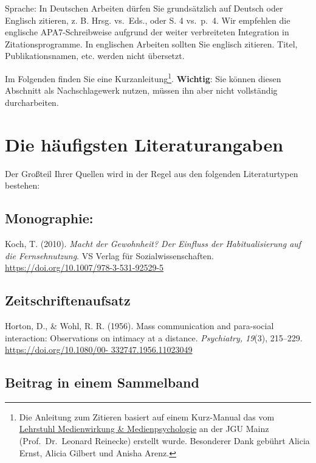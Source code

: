 \documentclass[
  letterpaper,
  DIV=11]{scrreprt}
\begin{document}
Sprache: In Deutschen Arbeiten dürfen Sie grundsätzlich auf Deutsch oder
Englisch zitieren, z. B. Hrsg. vs.~Eds., oder S. 4 vs.~p.~4. Wir
empfehlen die englische APA7-Schreibweise aufgrund der weiter
verbreiteten Integration in Zitationsprogramme. In englischen Arbeiten
sollten Sie englisch zitieren. Titel, Publikationsnamen, etc. werden
nicht übersetzt.

Im Folgenden finden Sie eine Kurzanleitung\footnote{Die Anleitung zum
  Zitieren basiert auf einem Kurz-Manual das vom
  \href{https://www.medienpsychologie.ifp.uni-mainz.de/}{Lehrstuhl
  Medienwirkung \& Medienpsychologie} an der JGU Mainz
  (Prof.~Dr.~Leonard Reinecke) erstellt wurde. Besonderer Dank gebührt
  Alicia Ernst, Alicia Gilbert und Anisha Arenz.}. \textbf{Wichtig}: Sie
können diesen Abschnitt als Nachschlagewerk nutzen, müssen ihn aber
nicht vollständig durcharbeiten.

\section{Die häufigsten
Literaturangaben}\label{die-huxe4ufigsten-literaturangaben}

Der Großteil Ihrer Quellen wird in der Regel aus den folgenden
Literaturtypen bestehen:

\subsection{Monographie:}\label{monographie}

Koch, T. (2010). \emph{Macht der Gewohnheit? Der Einfluss der
Habitualisierung auf die Fernsehnutzung}. VS Verlag für
Sozialwissenschaften. \url{https://doi.org/10.1007/978-3-531-92529-5}

\subsection{Zeitschriftenaufsatz}\label{zeitschriftenaufsatz}

Horton, D., \& Wohl, R. R. (1956). Mass communication and para-social
interaction: Observations on intimacy at a distance. \emph{Psychiatry,
19}(3), 215--229.
\href{https://doi.org/10.1080/00-\%20332747.1956.11023049}{https://doi.org/10.1080/00-
332747.1956.11023049}

\subsection{Beitrag in einem
Sammelband}\label{beitrag-in-einem-sammelband}
\end{document}
